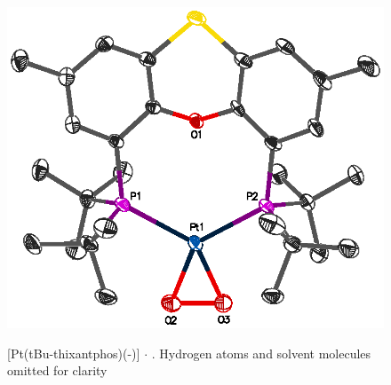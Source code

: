 \begin{figure}[ht]
\begin{center}
\vspace{0.5cm}
\includegraphics{../Figures/Crystalplatinumdioxygen.eps}
\caption[X-ray crystal structure of \texorpdfstring{[Pt(tBu-thixantphos)(\hapto{}-){]}} P $\cdot{}$ ]{[Pt(tBu-thixantphos)(\hapto{}-)] $\cdot{}$ .  Hydrogen atoms and solvent molecules omitted for clarity}
\vspace{0.2cm}
\label{crystal:dioxygen}
\end{center}
\end{figure}
\vspace{0.2cm}

